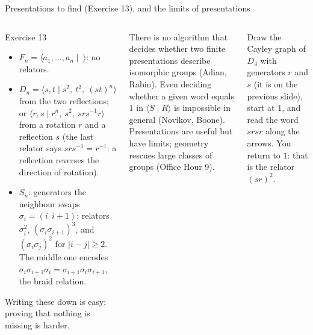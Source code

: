 \documentclass[aspectratio=169,10pt]{beamer}
\newcommand{\inv}{^{-1}}
\begin{document}
\begin{frame}{Presentations to find (Exercise 13), and the limits of presentations}
\begin{columns}[T]
\begin{exbox}{Exercise 13}
\begin{itemize}
\item $F_n=\langle a_1,\dots,a_n\mid\ \rangle$: no relators.
\item $D_n=\langle s,t\mid s^2,\ t^2,\ (st)^n\rangle$ from the two reflections; or $\langle r,s\mid r^n,\ s^2,\ srs\inv r\rangle$ from a rotation $r$ and a reflection $s$ (the last relator says $srs\inv=r\inv$: a reflection reverses the direction of rotation).
\item $S_n$: generators the neighbour swaps $\sigma_i=(i\;\,i{+}1)$; relators $\sigma_i^2$, $(\sigma_i\sigma_{i+1})^3$, and $(\sigma_i\sigma_j)^2$ for $|i-j|\ge2$. The middle one encodes $\sigma_i\sigma_{i+1}\sigma_i=\sigma_{i+1}\sigma_i\sigma_{i+1}$, the braid relation.
\end{itemize}
Writing these down is easy; proving that nothing is missing is harder.
\end{exbox}
\begin{pitbox}
There is no algorithm that decides whether two finite presentations describe isomorphic groups (Adian, Rabin). Even deciding whether a given word equals $1$ in $\langle S\mid R\rangle$ is impossible in general (Novikov, Boone). Presentations are useful but have limits; geometry rescues large classes of groups (Office Hour 9).
\end{pitbox}
\begin{trybox}
Draw the Cayley graph of $D_4$ with generators $r$ and $s$ (it is on the previous slide), start at $1$, and read the word $srsr$ along the arrows. You return to $1$: that is the relator $(sr)^2$.
\end{trybox}
\end{columns}
\end{frame}
\end{document}
